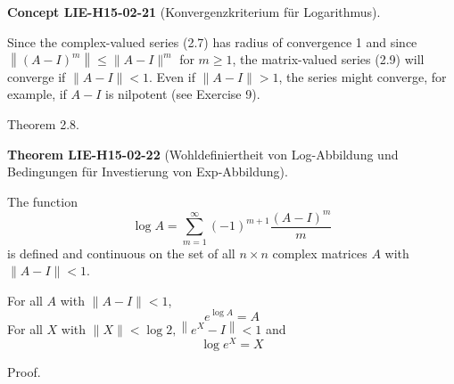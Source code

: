 \documentclass[10pt, letterpaper]{article}
\newcommand{\CustomHeading}[3]{%
  \par\medskip\noindent%
  \textbf{#1 #2} \textnormal{(#3)}.\enskip%
}
\newenvironment{THEO}[2]{\begin{unitbox}\CustomHeading{Theorem}{#1}{#2}}{\end{unitbox}}
\newenvironment{CONC}[2]{\begin{unitbox}\CustomHeading{Concept}{#1}{#2}}{\end{unitbox}}
\begin{document}
\begin{CONC}{LIE-H15-02-21}{Konvergenzkriterium für Logarithmus}
Since the complex-valued series (2.7) has radius of convergence 1 and since $\left\|(A-I)^{m}\right\| \leq\|A-I\|^{m}$ for $m \geq 1$, the matrix-valued series (2.9) will converge if $\|A-I\|<1$. Even if $\|A-I\|>1$, the series might converge, for example, if $A-I$ is nilpotent (see Exercise 9).
\end{CONC}

Theorem 2.8. 

\begin{THEO}{LIE-H15-02-22}{Wohldefiniertheit von Log-Abbildung und Bedingungen für Investierung von Exp-Abbildung}
The function
$$
\log A=\sum_{m=1}^{\infty}(-1)^{m+1} \frac{(A-I)^{m}}{m}
$$
is defined and continuous on the set of all $n \times n$ complex matrices $A$ with $\|A-I\|<1$.

For all $A$ with $\|A-I\|<1$,
$$
e^{\log A}=A
$$
For all $X$ with $\|X\|<\log 2,\left\|e^{X}-I\right\|<1$ and
$$
\log e^{X}=X
$$
\end{THEO}


Proof. 
\end{document}
